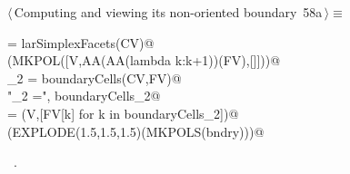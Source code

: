 \documentclass[11pt,oneside]{article}    %
\begin{document}
\begin{flushleft} \small \label{scrap103}
\protect{}$\langle\,$Computing and viewing its non-oriented boundary\nobreak\ {\footnotesize 58a}$\,\rangle\equiv$
\vspace{-1ex}
\begin{list}{}{} \item
\mbox{}\verb@FV = larSimplexFacets(CV)@\\
\mbox{}\verb@VIEW(MKPOL([V,AA(AA(lambda k:k+1))(FV),[]]))@\\
\mbox{}\verb@boundaryCells_2 = boundaryCells(CV,FV)@\\
\mbox{}\verb@print "\nboundaryCells_2 =\n", boundaryCells_2@\\
\mbox{}\verb@bndry = (V,[FV[k] for k in boundaryCells_2])@\\
\mbox{}\verb@VIEW(EXPLODE(1.5,1.5,1.5)(MKPOLS(bndry)))@\\
\mbox{}\verb@@{\NWsep}
\end{list}
\vspace{-1ex}
\footnotesize\addtolength{\baselineskip}{-1ex}
\begin{list}{}{\setlength{\itemsep}{-\parsep}\setlength{\itemindent}{-\leftmargin}}
\item \NWtxtMacroRefIn\ .
\end{list}
\end{flushleft}
\end{document}
